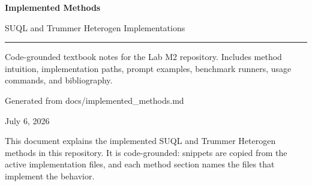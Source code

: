 \documentclass[11pt,oneside]{book}
\begin{document}
\frontmatter
\begin{titlepage}
\pagecolor{soft}
\vspace*{2.2cm}
{\sffamily\bfseries\fontsize{30}{36}\selectfont Implemented Methods\par}
\vspace{0.35cm}
{\sffamily\Large SUQL and Trummer Heterogen Implementations\par}
\vspace{1.2cm}
{\color{accent}\rule{0.62\textwidth}{1.5pt}\par}
\vspace{1.0cm}
\begin{tcolorbox}[colback=white,colframe=accent,arc=1mm,boxrule=0.8pt,width=0.78\textwidth]
\sffamily\large Code-grounded textbook notes for the Lab M2 repository. Includes method intuition, implementation paths, prompt examples, benchmark runners, usage commands, and bibliography.
\end{tcolorbox}
\vfill
{\sffamily\large Generated from docs/implemented\_methods.md\par}
{\sffamily\normalsize July 6, 2026\par}
\end{titlepage}
\nopagecolor
\tableofcontents
\mainmatter

This document explains the implemented SUQL and Trummer Heterogen methods in this repository. It is code-grounded: snippets are copied from the active implementation files, and each method section names the files that implement the behavior.
\end{document}
